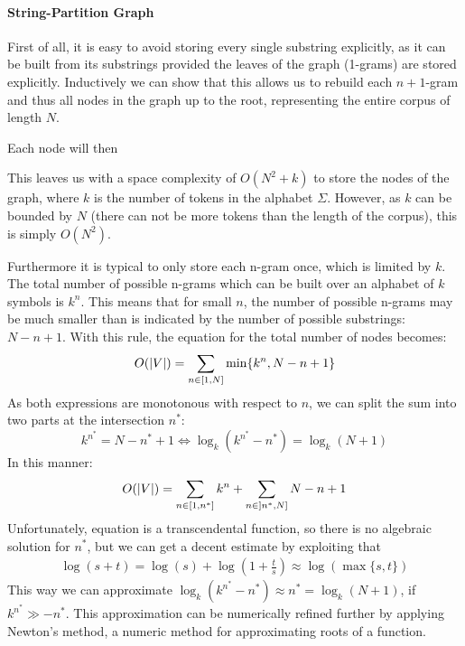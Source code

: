 \paragraph*{String-Partition Graph}

First of all, it is easy to avoid storing every single substring explicitly, as it can be built from its substrings provided the leaves of the graph (1-grams) are stored explicitly. Inductively we can show that this allows us to rebuild each $n+1$-gram and thus all nodes in the graph up to the root, representing the entire corpus of length $N$.

Each node will then 

\noindent
This leaves us with a space complexity of $O(N^2 + k)$ to store the nodes of the graph, where $k$ is the number of tokens in the alphabet $\Sigma$. However, as $k$ can be bounded by $N$ (there can not be more tokens than the length of the corpus), this is simply $O(N^2)$.

Furthermore it is typical to only store each n-gram once, which is limited by $k$. The total number of possible n-grams which can be built over an alphabet of $k$ symbols is $k^n$. This means that for small $n$, the number of possible n-grams may be much smaller than is indicated by the number of possible substrings: $N - n + 1$. With this rule, the equation for the total number of nodes becomes:
\begin{align*}
    O(|V|) = \sum_{n \in \interval{1}{N}}{\min\{k^n, N - n + 1\}}
\end{align*}
As both expressions are monotonous with respect to $n$, we can split the sum into two parts at the intersection $n^*$:
\begin{equation} \label{eq:1}
    k^{n^*} = N - n^* + 1 \Leftrightarrow \log_k(k^{n^*} - n^*) = \log_k(N + 1)
\end{equation}
In this manner:
\begin{align*}
    O(|V|) = \sum_{n \in \interval{1}{n^*}}{k^n} + \sum_{n \in \interval[open left]{n^*}{N}}{N - n + 1}
\end{align*}
Unfortunately, equation is a transcendental function, so there is no algebraic solution for $n^*$, but we can get a decent estimate by exploiting that
\begin{align*}
    \log(s + t) = \log(s) + \log(1 + \frac{t}{s}) \approx \log(\max\{s, t\})
\end{align*}
This way we can approximate $\log_k(k^{n^*} - n^*) \approx n^* = \log_k(N + 1)$, if $k^{n^*} \gg -n^*$. This approximation can be numerically refined further by applying Newton's method, a numeric method for approximating roots of a function.


